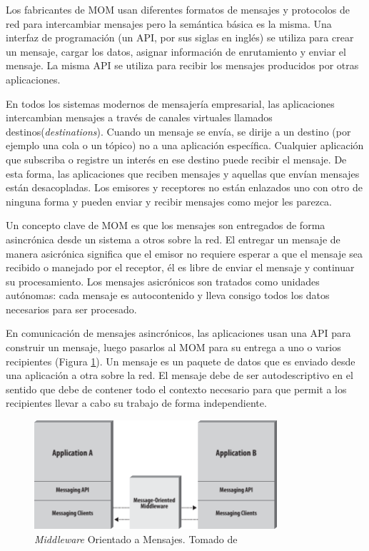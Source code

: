 \documentclass[conference]{IEEEtran}
\begin{document}
Los fabricantes de MOM usan diferentes formatos de mensajes y protocolos de red para intercambiar mensajes pero la semántica básica es la misma. Una interfaz de programación (un API, por sus siglas en inglés) se utiliza para crear un mensaje, cargar los datos, asignar información de enrutamiento y enviar el mensaje. La misma API se utiliza para recibir los mensajes producidos por otras aplicaciones.

En todos los sistemas modernos de mensajería empresarial, las aplicaciones intercambian mensajes a través de canales virtuales llamados destinos(\emph{destinations}). Cuando un mensaje se envía, se dirije a un destino (por ejemplo una cola o un tópico) no a una aplicación específica. Cualquier aplicación que subscriba o registre un interés en ese destino puede recibir el mensaje. De esta forma, las aplicaciones que reciben mensajes y aquellas que envían mensajes están desacopladas. Los emisores y receptores no están enlazados uno con otro de ninguna forma y pueden enviar y recibir mensajes como mejor les parezca.

Un concepto clave de MOM es que los mensajes son entregados de forma asincrónica desde un sistema a otros sobre la red. El entregar un mensaje de manera asicrónica significa que el emisor no requiere esperar a que el mensaje sea recibido o manejado por el receptor, él es libre de enviar el mensaje y continuar su procesamiento. Los mensajes asicrónicos son tratados como unidades autónomas: cada mensaje es autocontenido y lleva consigo todos los datos necesarios para ser procesado.

En comunicación de mensajes asincrónicos, las aplicaciones usan una API para construir un mensaje, luego pasarlos al MOM para su entrega a uno o varios recipientes (Figura \ref{fig:mom}). Un mensaje es un paquete de datos que es enviado desde una aplicación a otra sobre la red. El mensaje debe de ser autodescriptivo en el sentido que debe de contener todo el contexto necesario para que permit a los recipientes llevar a cabo su trabajo de forma independiente. 

\begin{figure}[h]
  \centering
  \includegraphics[width=9cm]{jms20-mom}
  \caption{\small{\emph{Middleware} Orientado a Mensajes. Tomado de \cite{jms20}}}
  \label{fig:mom}
\end{figure}
\end{document}

